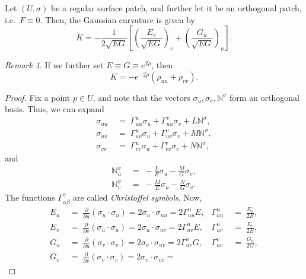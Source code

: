 \documentclass[11pt]{article}
\newcommand{\N}{\mathbb{N}}
\newcommand{\pp}[2]{\frac{\partial #1}{\partial #2}}
\theoremstyle{definition}
\theoremstyle{remark}
\newtheorem*{remark}{Remark}
\numberwithin{equation}{section}
\begin{document}
    \begin{theorem}
        Let $(U, \sigma)$ be a regular surface patch, and further let it be an
        orthogonal patch, i.e.\ $F \equiv 0$. Then, the Gaussian curvature is given
        by \[
            K = -\frac{1}{2\sqrt{EG}}\left[\left(\frac{E_v}{\sqrt{EG}}\right)_v +
            \left(\frac{G_u}{\sqrt{EG}}\right)_u\right].
        \] 
        \begin{remark}
            If we further set $E \equiv G \equiv e^{2\rho}$, then \[
                K = -e^{-2\rho}(\rho_{uu} + \rho_{vv}).
            \] 
        \end{remark}
    \end{theorem}
    \begin{proof}
        Fix a point $p \in U$, and note that the vectors $\sigma_u, \sigma_v,
        \N^\sigma$ form an orthogonal basis. Thus, we can expand \begin{align*}
            \sigma_{uu} \;&=\; \Gamma_{uu}^u \sigma_u + \Gamma_{uu}^v \sigma_v +
            L\N^\sigma, \\
            \sigma_{uv} \;&=\; \Gamma_{uv}^u \sigma_u + \Gamma_{uv}^v \sigma_v +
            M\N^\sigma, \\
            \sigma_{vv} \;&=\; \Gamma_{vv}^u \sigma_u + \Gamma_{vv}^v \sigma_v +
            N\N^\sigma,
        \end{align*} and \begin{align*}
            \N^\sigma_u \;&=\; -\frac{L}{E}\sigma_u - \frac{M}{G}\sigma_v, \\
            \N^\sigma_v \;&=\; -\frac{M}{E}\sigma_u - \frac{N}{G}\sigma_v.
        \end{align*}
        The functions $\Gamma_{\alpha\beta}^{\gamma}$ are called \emph{Christoffel
        symbols}. Now, \begin{align*}
            E_u \;&=\; \pp{}{u}(\sigma_u\cdot\sigma_u) = 2\sigma_u\cdot \sigma_{uu} =
            2\Gamma_{uu}^u E, &
            \Gamma_{uu}^u \;&=\; \frac{E_u}{2E}, \\
            E_v \;&=\; \pp{}{v}(\sigma_u\cdot\sigma_u) = 2\sigma_u\cdot \sigma_{uv} =
            2\Gamma_{uv}^u E, &
            \Gamma_{uv}^u \;&=\; \frac{E_v}{2E}, \\
            G_u \;&=\; \pp{}{u}(\sigma_v\cdot\sigma_v) = 2\sigma_v\cdot \sigma_{uv} =
            2\Gamma_{uv}^v G, &
            \Gamma_{uv}^v \;&=\; \frac{G_u}{2G}, \\
            G_v \;&=\; \pp{}{v}(\sigma_v\cdot\sigma_v) = 2\sigma_v\cdot \sigma_{vv} =

\end{align*}
\end{proof}
\end{document}
